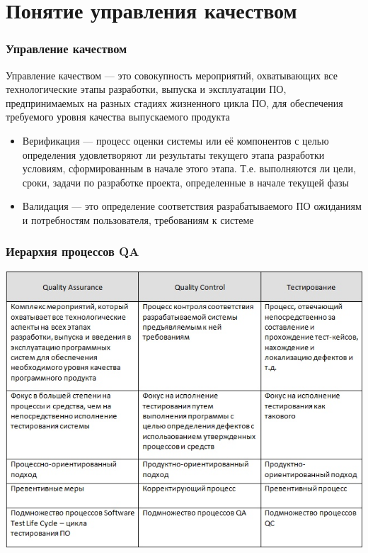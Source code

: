\documentclass{../industrial-development}
\begin{document}
\section{Понятие управления качеством}
\begin{frame} \frametitle {Управление качеством}
\begin{block}{}
	\alert{Управление качеством} --- это совокупность мероприятий, охватывающих все технологические этапы разработки, выпуска и эксплуатации ПО, предпринимаемых на разных стадиях жизненного цикла ПО, для обеспечения требуемого уровня качества выпускаемого продукта	
\end{block}
	\begin{itemize}
	\item Верификация --- процесс оценки системы или её компонентов с целью определения удовлетворяют ли результаты текущего этапа разработки условиям, сформированным в начале этого этапа. Т.е. выполняются ли цели, сроки, задачи по разработке проекта, определенные в начале текущей фазы
\end{itemize}
	\begin{itemize}
	\item Валидация --- это определение соответствия разрабатываемого ПО ожиданиям и потребностям пользователя, требованиям к системе
\end{itemize}
\end{frame}	

\begin{frame} \frametitle{Иерархия процессов QA}
\centerline{\includegraphics[height=1.0\textheight]{QA_QC.png}}
\end{frame}
\end{document}
